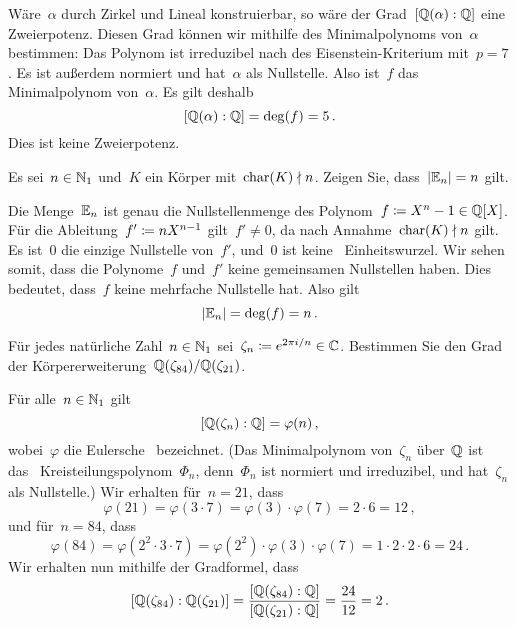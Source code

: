 \documentclass{scrartcl}
\begin{document}
\begin{solution}
  Wäre~$\alpha$ durch Zirkel und Lineal konstruierbar, so wäre der Grad~$[\mathbb{Q}(\alpha) : \mathbb{Q}]$ eine Zweierpotenz.
  Diesen Grad können wir mithilfe des Minimalpolynoms von~$\alpha$ bestimmen:
  Das Polynom ist irreduzibel nach des Eisenstein-Kriterium mit~$p = 7$.
  Es ist außerdem normiert und hat~$\alpha$ als Nullstelle.
  Also ist~$f$ das Minimalpolynom von~$\alpha$.
  Es gilt deshalb
  \[
    [\mathbb{Q}(\alpha) : \mathbb{Q}]
    =
    \deg(f)
    =
    5 \,.
  \]
  Dies ist keine Zweierpotenz.
\end{solution}

\begin{exercise}
  Es sei~$n \in \mathbb{N}_1$ und~$K$ ein Körper mit~$\operatorname{char}(K) \nmid n$.
  Zeigen Sie, dass~$\lvert \operatorname{\mathbb{E}}_n \rvert = n$ gilt.
\end{exercise}

\begin{solution}
  Die Menge~$\operatorname{\mathbb{E}}_n$ ist genau die Nullstellenmenge des Polynom~$f \coloneqq X^n - 1 \in \mathbb{Q}[X]$.
  Für die Ableitung~$f' \coloneqq n X^{n-1}$ gilt~$f' \neq 0$, da nach Annahme~$\operatorname{char}(K) \nmid n$ gilt.
  Es ist~$0$ die einzige Nullstelle von~$f'$, und~$0$ ist keine~ Einheitswurzel.
  Wir sehen somit, dass die Polynome~$f$ und~$f'$ keine gemeinsamen Nullstellen haben.
  Dies bedeutet, dass~$f$ keine mehrfache Nullstelle hat.
  Also gilt
  \[
    \lvert \operatorname{\mathbb{E}}_n \rvert
    =
    \deg(f)
    =
    n \,.
  \]
\end{solution}

\begin{exercise}
  Für jedes natürliche Zahl~$n \in \mathbb{N}_1$ sei~$\zeta_n \coloneqq e^{2 \pi i / n} \in \mathbb{C}$.
  Bestimmen Sie den Grad der Körpererweiterung~$\mathbb{Q}(\zeta_{84}) / \mathbb{Q}(\zeta_{21})$.
\end{exercise}

\begin{solution}
  Für alle~$n \in \mathbb{N}_1$ gilt
  \[
    [\mathbb{Q}(\zeta_n) : \mathbb{Q}]
    =
    \varphi(n) \,,
  \]
  wobei~$\varphi$ die Eulersche~\Funktion{$\varphi$} bezeichnet.
  (Das Minimalpolynom von~$\zeta_n$ über~$\mathbb{Q}$ ist das~ Kreisteilungspolynom~$\Phi_n$, denn~$\Phi_n$ ist normiert und irreduzibel, und hat~$\zeta_n$ als Nullstelle.)
  Wir erhalten für~$n = 21$, dass
  \[
    \varphi(21)
    =
    \varphi(3 \cdot 7)
    =
    \varphi(3) \cdot \varphi(7)
    =
    2 \cdot 6 
    =
    12 \,,
  \]
  und für~$n = 84$, dass
  \[
    \varphi(84)
    =
    \varphi(2^2 \cdot 3 \cdot 7)
    =
    \varphi(2^2) \cdot \varphi(3) \cdot \varphi(7)
    =
    1 \cdot 2 \cdot 2 \cdot 6
    =
    24 \,.
  \]
  Wir erhalten nun mithilfe der Gradformel, dass
  \[
    [ \mathbb{Q}(\zeta_{84}) : \mathbb{Q}(\zeta_{21}) ]
    =
    \frac{ [\mathbb{Q}(\zeta_{84}) : \mathbb{Q}] }{ [\mathbb{Q}(\zeta_{21}) : \mathbb{Q}] }
    =
    \frac{24}{12}
    =
    2 \,.
  \]
\end{solution}




\clearpage





\printsolutions
\end{document}
